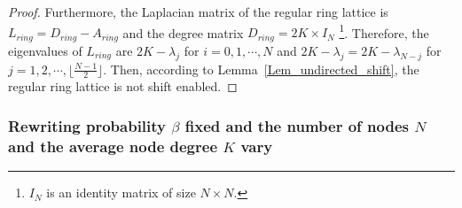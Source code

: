 \documentclass[journal]{IEEEtran}
\begin{document}
\begin{proof}
 Furthermore, the Laplacian matrix of the regular ring lattice is $L_{ring}=D_{ring}-A_{ring}$ and the degree matrix $D_{ring}=2K\times I_N$ \footnote{$I_N$ is an identity matrix of size $N \times N$.}. Therefore, the eigenvalues of $L_{ring}$ are $2K-\lambda_j$ for $i=0,1,\cdots,N$ and $2K-\lambda_j =2K-\lambda_{N-j}$ for $j=1,2,\cdots,\lfloor \frac{N-1}{2} \rfloor$.
Then, according to Lemma~\ref{Lem_undirected_shift}, the regular ring lattice is not shift enabled.



\end{proof}
\subsubsection{Rewriting probability $\beta$ fixed and the number of nodes $N$ and the average node degree $K$ vary}
\end{document}
